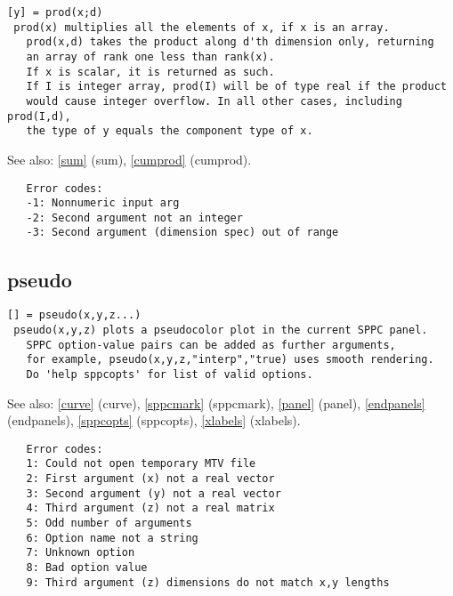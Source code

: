 \documentclass[a4paper]{article}
\begin{document}
\begin{tscreen}
\begin{verbatim}
[y] = prod(x;d)
 prod(x) multiplies all the elements of x, if x is an array.
   prod(x,d) takes the product along d'th dimension only, returning
   an array of rank one less than rank(x).
   If x is scalar, it is returned as such.
   If I is integer array, prod(I) will be of type real if the product
   would cause integer overflow. In all other cases, including prod(I,d),
   the type of y equals the component type of x.
\end{verbatim}

See also: \ref{sum} {(sum)}, \ref{cumprod} {(cumprod)}.
\begin{verbatim}
   Error codes:
   -1: Nonnumeric input arg
   -2: Second argument not an integer
   -3: Second argument (dimension spec) out of range 
\end{verbatim}
\end{tscreen}





\subsection{pseudo\label{pseudo}}

\begin{tscreen}
\begin{verbatim}
[] = pseudo(x,y,z...)
 pseudo(x,y,z) plots a pseudocolor plot in the current SPPC panel.
   SPPC option-value pairs can be added as further arguments,
   for example, pseudo(x,y,z,"interp","true) uses smooth rendering.
   Do 'help sppcopts' for list of valid options.
\end{verbatim}

See also: \ref{curve} {(curve)}, \ref{sppcmark} {(sppcmark)}, \ref{panel} {(panel)}, \ref{endpanels} {(endpanels)}, \ref{sppcopts} {(sppcopts)}, \ref{xlabels} {(xlabels)}.
\begin{verbatim}
   Error codes:
   1: Could not open temporary MTV file
   2: First argument (x) not a real vector
   3: Second argument (y) not a real vector
   4: Third argument (z) not a real matrix
   5: Odd number of arguments
   6: Option name not a string
   7: Unknown option
   8: Bad option value
   9: Third argument (z) dimensions do not match x,y lengths
\end{verbatim}
\end{tscreen}
\end{document}
